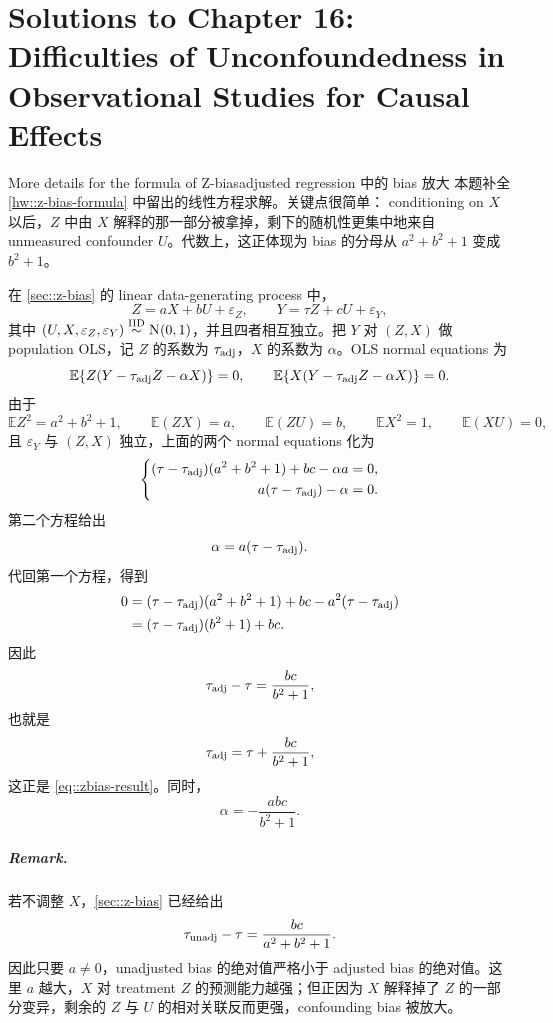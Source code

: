 \chapter{Solutions to Chapter 16: Difficulties of Unconfoundedness in Observational Studies for Causal Effects}
\label{sol:chapter16}

\begin{exercisesolution}{More details for the formula of Z-bias}{adjusted regression 中的 bias 放大}
本题补全 \cref{hw::z-bias-formula} 中留出的线性方程求解。关键点很简单：
conditioning on $X$ 以后，$Z$ 中由 $X$ 解释的那一部分被拿掉，剩下的随机性更集中地来自 unmeasured confounder $U$。代数上，这正体现为 bias 的分母从 $a^2+b^2+1$ 变成 $b^2+1$。

在 \cref{sec::z-bias} 的 linear data-generating process 中，
\[
Z=aX+bU+\varepsilon_Z,\qquad
Y=\tau Z+cU+\varepsilon_Y,
\]
其中 $(U,X,\varepsilon_Z,\varepsilon_Y)\iidsim\N01$，并且四者相互独立。把 $Y$ 对 $(Z,X)$ 做 population OLS，记 $Z$ 的系数为 $\tau_\textup{adj}$，$X$ 的系数为 $\alpha$。OLS normal equations 为
\[
\mathbb{E}\{Z(Y-\tau_\textup{adj}Z-\alpha X)\}=0,\qquad
\mathbb{E}\{X(Y-\tau_\textup{adj}Z-\alpha X)\}=0.
\]
由于
\[
\mathbb{E}Z^2=a^2+b^2+1,\qquad
\mathbb{E}(ZX)=a,\qquad
\mathbb{E}(ZU)=b,\qquad
\mathbb{E}X^2=1,\qquad
\mathbb{E}(XU)=0,
\]
且 $\varepsilon_Y$ 与 $(Z,X)$ 独立，上面的两个 normal equations 化为
\[
\left\{
\begin{aligned}
(\tau-\tau_\textup{adj})(a^2+b^2+1)+bc-\alpha a&=0,\\
a(\tau-\tau_\textup{adj})-\alpha&=0.
\end{aligned}
\right.
\]
第二个方程给出
\[
\alpha=a(\tau-\tau_\textup{adj}).
\]
代回第一个方程，得到
\begin{align*}
0
&=(\tau-\tau_\textup{adj})(a^2+b^2+1)+bc
  -a^2(\tau-\tau_\textup{adj})\\
&=(\tau-\tau_\textup{adj})(b^2+1)+bc.
\end{align*}
因此
\[
\tau_\textup{adj}-\tau=\frac{bc}{b^2+1},
\]
也就是
\[
\tau_\textup{adj}=\tau+\frac{bc}{b^2+1},
\]
这正是 \cref{eq::zbias-result}。同时，
\[
\alpha=-\frac{abc}{b^2+1}.
\]

\paragraph{Remark.}
若不调整 $X$，\cref{sec::z-bias} 已经给出
\[
\tau_\textup{unadj}-\tau=\frac{bc}{a^2+b^2+1}.
\]
因此只要 $a\neq 0$，unadjusted bias 的绝对值严格小于 adjusted bias 的绝对值。这里 $a$ 越大，$X$ 对 treatment $Z$ 的预测能力越强；但正因为 $X$ 解释掉了 $Z$ 的一部分变异，剩余的 $Z$ 与 $U$ 的相对关联反而更强，confounding bias 被放大。
\end{exercisesolution}

